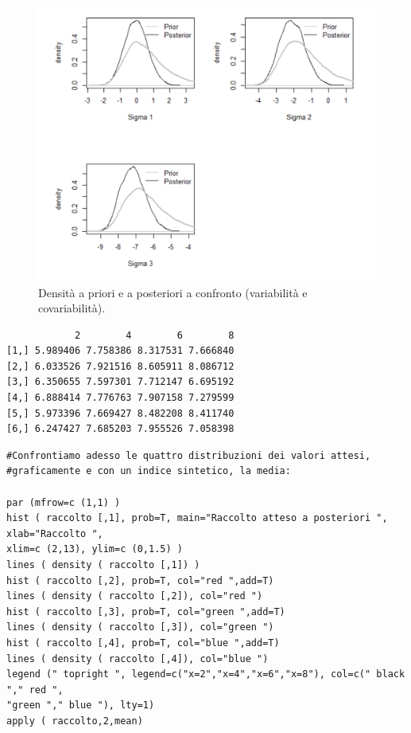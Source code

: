 \begin{figure}
    \centering
    \includegraphics[totalheight=10cm]{img/esercizio11-2-4.png}
    \caption{  Densità a priori e a posteriori a confronto (variabilità e covariabilità).}
\end{figure}

{
\color{red}
\begin{Verbatim}
            2        4        6        8
[1,] 5.989406 7.758386 8.317531 7.666840
[2,] 6.033526 7.921516 8.605911 8.086712
[3,] 6.350655 7.597301 7.712147 6.695192
[4,] 6.888414 7.776763 7.907158 7.279599
[5,] 5.973396 7.669427 8.482208 8.411740
[6,] 6.247427 7.685203 7.955526 7.058398
\end{Verbatim}
}

\begin{lstlisting}[style=R]
#Confrontiamo adesso le quattro distribuzioni dei valori attesi,
#graficamente e con un indice sintetico, la media:

par (mfrow=c (1,1) )
hist ( raccolto [,1], prob=T, main="Raccolto atteso a posteriori ", xlab="Raccolto ",
xlim=c (2,13), ylim=c (0,1.5) )
lines ( density ( raccolto [,1]) )
hist ( raccolto [,2], prob=T, col="red ",add=T)
lines ( density ( raccolto [,2]), col="red ")
hist ( raccolto [,3], prob=T, col="green ",add=T)
lines ( density ( raccolto [,3]), col="green ")
hist ( raccolto [,4], prob=T, col="blue ",add=T)
lines ( density ( raccolto [,4]), col="blue ")
legend (" topright ", legend=c("x=2","x=4","x=6","x=8"), col=c(" black "," red ",
"green "," blue "), lty=1)
apply ( raccolto,2,mean)
\end{lstlisting}


